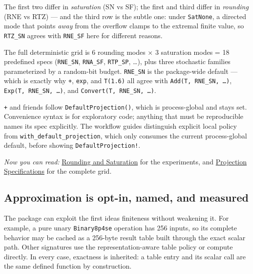 The first two differ in \emph{saturation} (SN vs SF); the first and third differ in \emph{rounding} (RNE vs RTZ) — and the third row is the subtle one: under \texttt{SatNone}, a directed mode that points \emph{away} from the overflow clamps to the extremal finite value, so \texttt{RTZ\_\allowbreak{}SN} agrees with \texttt{RNE\_\allowbreak{}SF} here for different reasons.



The full deterministic grid is 6 rounding modes × 3 saturation modes = 18 predefined specs (\texttt{RNE\_\allowbreak{}SN}, \texttt{RNA\_\allowbreak{}SF}, \texttt{RTP\_\allowbreak{}SP}, …), plus three stochastic families parameterized by a random-bit budget. \texttt{RNE\_\allowbreak{}SN} is the package-wide default — which is exactly why \texttt{+}, \texttt{exp}, and \texttt{T(1.6)} all agree with \texttt{Add(T, RNE\_\allowbreak{}SN, …)}, \texttt{Exp(T, RNE\_\allowbreak{}SN, …)}, and \texttt{Convert(T, RNE\_\allowbreak{}SN, …)}.



\begin{tcolorbox}[toptitle=-1mm,bottomtitle=1mm,colback=admonition-warning!50!white,colframe=admonition-warning,title=\textbf{The default is a session default}]
\texttt{+} and friends follow \texttt{DefaultProjection()}, which is process-global and stays set. Convenience syntax is for exploratory code; anything that must be reproducible names its spec explicitly. The workflow guides distinguish explicit local policy from \texttt{with\_\allowbreak{}default\_\allowbreak{}projection}, which only consumes the current process-global default, before showing \texttt{DefaultProjection!}.

\end{tcolorbox}


\emph{Now you can read:} \href{concept\_\allowbreak{}rounding\_\allowbreak{}saturation.md}{Rounding and Saturation} for the experiments, and \href{reference\_\allowbreak{}projections.md}{Projection Specifications} for the complete grid.



\subsection{Approximation is opt-in, named, and measured}



\label{894732549624983631}{}


The package can exploit the first idea{\textquotesingle}s finiteness without weakening it. For example, a pure unary \texttt{Binary8p4se} operation has 256 inputs, so its complete behavior may be cached as a 256-byte result table built through the exact scalar path. Other signatures use the representation-aware table policy or compute directly. In every case, exactness is inherited: a table entry and its scalar call are the same defined function by construction.



